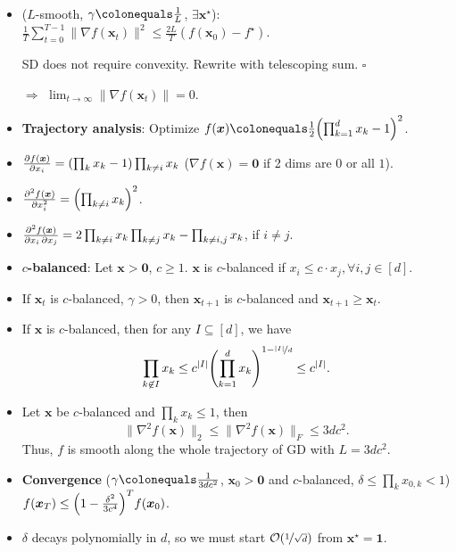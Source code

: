 \documentclass[8pt,a4paper]{extarticle}
\renewcommand{\proof}[1]{\begin{tcolorbox}#1 \hfill $\square$\end{tcolorbox}}
\newcommand{\lft}{\mathopen{}\mathclose\bgroup\left}
\newcommand{\rgt}{\aftergroup\egroup\right}
\renewcommand{\vec}[1]{\bm{#1}}
\newenvironment{topic}[1]
{\textbf{\sffamily \colorbox{black}{\rlap{\textbf{\textcolor{white}{#1}}}\hspace{\linewidth}\hspace{-2\fboxsep}}} \\ \vspace{0.2cm}}
{}
\begin{document}
\begin{multicols*}{2}
    \begin{topic}{Nonconvex functions}
        \begin{itemize}
            \item ($L$-smooth, $\gamma \colonequals \frac{1}{L}$, $\exists \vec{x}^\star$): $\frac{1}{T} \sum_{t=0}^{T-1} \| \nabla f(\vec{x}_t) \|^2 \leq \frac{2L}{T} (f(\vec{x}_0) - f^\star)$.
                  \proof{SD does not require convexity. Rewrite with telescoping sum.}
                  $\Rightarrow$ $\lim_{t\to \infty} \| \nabla f(\vec{x}_t) \| = 0$.
            \item \textbf{Trajectory analysis}: Optimize $f(\vec{x}) \colonequals \frac{1}{2} \lft( \prod_{k=1}^d x_k - 1 \rgt)^2$.
            \item $\pdv{f(\vec{x})}{x_i} = \lft( \prod_k x_k - 1 \rgt) \prod_{k\neq i} x_k$ ($\nabla f(\vec{x})=\vec{0}$ if 2 dims are $0$ or all $1$).
            \item $\pdv[order=2]{f(\vec{x})}{x_i} = \lft( \prod_{k\neq i} x_k \rgt)^2$.
            \item $\pdv{f(\vec{x})}{x_i,x_j} = 2 \prod_{k\neq i} x_k \prod_{k \neq j} x_k - \prod_{k\neq i,j} x_k$, if $i \neq j$.
            \item \textbf{$c$-balanced}: Let $\vec{x} > \vec{0}$, $c \geq 1$. $\vec{x}$ is $c$-balanced if $x_i \leq c \cdot x_j, \forall i, j \in [d]$.
            \item If $\vec{x}_t$ is $c$-balanced, $\gamma > 0$, then $\vec{x}_{t+1}$ is $c$-balanced and
                  $\vec{x}_{t+1} \geq \vec{x}_t$.
            \item If $\vec{x}$ is $c$-balanced, then for any $I \subseteq [d]$, we have \[
                      \prod_{k \not\in I} x_k \leq c^{|I|} \lft( \prod_{k=1}^d x_k \rgt)^{1 - \nicefrac{|I|}{d}} \leq c^{|I|}.
                  \]
            \item Let $\vec{x}$ be $c$-balanced and $\prod_k x_k \leq 1$, then \[
                      \| \nabla^2 f(\vec{x}) \|_2 \leq \| \nabla^2 f(\vec{x}) \|_F \leq 3dc^2.
                  \]
                  Thus, $f$ is smooth along the whole trajectory of GD with $L = 3dc^2$.
            \item \textbf{Convergence} ($\gamma \colonequals \frac{1}{3dc^2}$, $\vec{x}_0 > \vec{0}$ and $c$-balanced, $\delta \leq \prod_k x_{0,k} < 1$) \\ $f(\vec{x}_T) \leq \lft( 1 - \frac{\delta^2}{3c^4} \rgt)^T f(\vec{x}_0)$.
            \item $\delta$ decays polynomially in $d$, so we must start $\mathcal{O}(\nicefrac{1}{\sqrt{d}})$ from $\vec{x}^\star = \vec{1}$.
        \end{itemize}
    \end{topic}


\end{multicols*}
\end{document}
